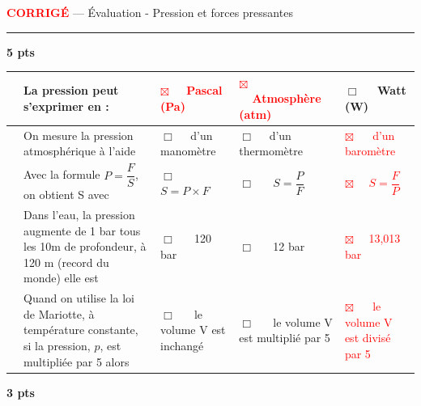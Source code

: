 \documentclass[11pt,a4paper]{article}
\begin{document}
\begin{center}
\LARGE{\textcolor{red}{\textbf{CORRIGÉ}} — Évaluation - Pression et forces pressantes}\\[8mm]
\end{center}
\normalsize
\hrule

\vspace{8mm}


\noindent{} \hfill \textbf{5 pts}

\begin{tabular}{p{2mm} p{5.5cm}|C{3cm}|C{3cm}|C{3cm}}

     & La pression peut s'exprimer en :& \textcolor{red}{$\boxtimes$ ~~Pascal (Pa)} & \textcolor{red}{$\boxtimes$ ~~Atmosphère (atm)}   & $\Box $ ~~Watt (W) \\
     \hline
   & On mesure la pression atmosphérique à l'aide   & $\Box $ ~~d'un manomètre & $\Box $ ~~d'un thermomètre  & \textcolor{red}{$\boxtimes$ ~~ d'un baromètre} \\
    \hline
      & Avec la formule $P=\dfrac{F}{S}$, on obtient S avec  &$\Box $ ~~ $S=P \times F$  &$\Box $ ~~ $S=\dfrac{P}{F}$  & \textcolor{red}{$\boxtimes$ ~~$S=\dfrac{F}{P}$}   \\
     \hline
      & Dans l'eau, la pression augmente de 1 bar tous les 10m de profondeur, à 120 m (record du monde)  elle est   &$\Box $ ~~ 120 bar &$\Box $ ~~ 12 bar & \textcolor{red}{$\boxtimes$ ~~13,013 bar} \\
     \hline
     & Quand on utilise la loi de Mariotte, à température constante,  si la pression, $p$, est multipliée par 5 alors &$\Box $ ~~ le volume V est inchangé &$\Box $ ~~ le volume V est multiplié par 5  & \textcolor{red}{$\boxtimes$ ~~ le volume V est divisé par 5}  \\

     \end{tabular}

\vspace{3mm}


\noindent{} \hfill \textbf{3 pts}
\end{document}
